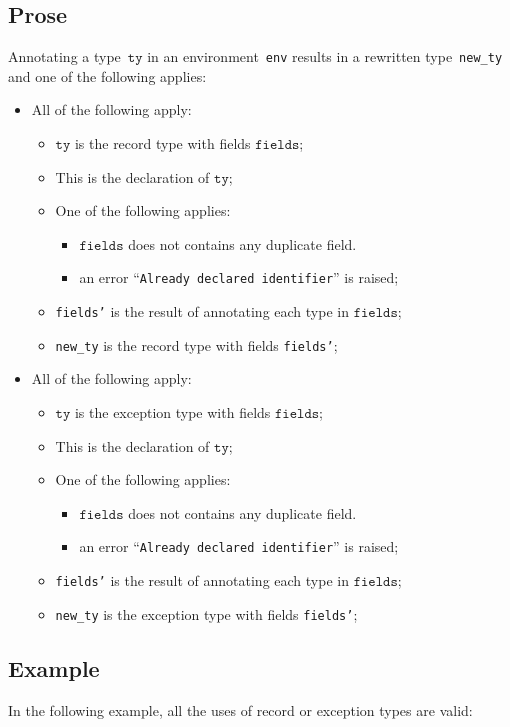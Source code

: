 \documentclass{book}
\newcommand\tty[0]{\texttt{ty}}
\newcommand\fields[0]{\texttt{fields}}
\begin{document}
\begin{itemize}
\subsection{Prose}
Annotating a type~$\tty$ in an environment~\texttt{env} results in a
rewritten type~\texttt{new\_ty} and one of the following applies:
\begin{itemize}
  \item All of the following apply:
    \begin{itemize}
      \item $\tty$ is the record type with fields $\fields$;
      \item This is the declaration of $\tty$;
      \item One of the following applies:
        \begin{itemize}
          \item $\fields$ does not contains any duplicate field.
          \item an error ``\texttt{Already declared identifier}'' is raised;
        \end{itemize}
      \item \texttt{fields'} is the result of annotating each type in
        $\fields$;
      \item \texttt{new\_ty} is the record type with fields \texttt{fields'};
    \end{itemize}
  \item All of the following apply:
    \begin{itemize}
      \item $\tty$ is the exception type with fields $\fields$;
      \item This is the declaration of $\tty$;
      \item One of the following applies:
        \begin{itemize}
          \item $\fields$ does not contains any duplicate field.
          \item an error ``\texttt{Already declared identifier}'' is raised;
        \end{itemize}
      \item \texttt{fields'} is the result of annotating each type in
        $\fields$;
      \item \texttt{new\_ty} is the exception type with fields \texttt{fields'};
    \end{itemize}
\end{itemize}


\subsection{Example}
In the following example, all the uses of record or exception types are valid:




\end{itemize}
\end{document}
